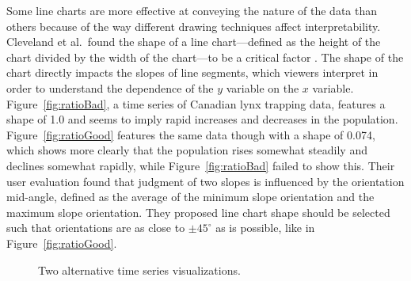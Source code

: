 Some line charts are more effective at conveying the nature of the data than others because of the way different drawing techniques affect interpretability.  Cleveland et al.\ found the shape of a line chart---defined as the height of the chart divided by the width of the chart---to be a critical factor \citeyearpar{cleveland1988}.   The shape of the chart directly impacts the slopes of line segments, which viewers interpret in order to understand the dependence of the $y$ variable on the $x$ variable.  Figure~\ref{fig:ratioBad}, a time series of Canadian lynx trapping data, features a shape of 1.0 and seems to imply rapid increases and decreases in the population.  Figure~\ref{fig:ratioGood} features the same data though with a shape of 0.074, which shows more clearly that the population rises somewhat steadily and declines somewhat rapidly, while Figure~\ref{fig:ratioBad} failed to show this.  Their user evaluation found that judgment of two slopes is influenced by the orientation mid-angle, defined as the average of the minimum slope orientation and the maximum slope orientation.  They proposed line chart shape should be selected such that orientations are as close to $\pm 45 ^{\circ}$ as is possible, like in Figure~\ref{fig:ratioGood}.

\begin{figure}
\centering

 \qquad
{}

	\caption[Two alternative time series visualizations]{Two alternative time series visualizations.}
	\label{fig:tsAlternatives}
\end{figure}

